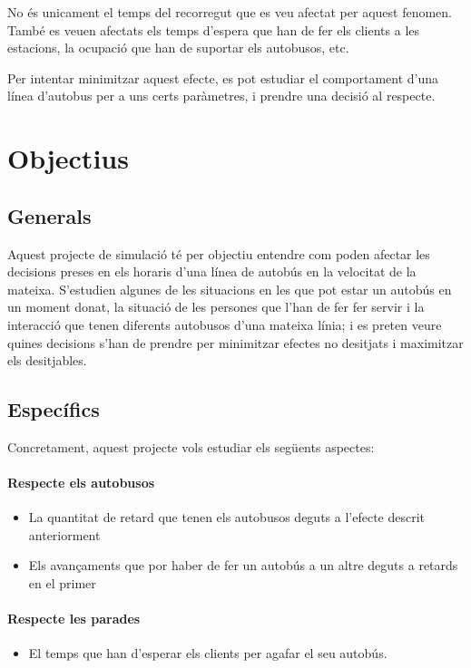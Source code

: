 \documentclass[a4paper,10pt]{article}
\begin{document}
No és unicament el temps del recorregut que es veu afectat per aquest fenomen. També es veuen afectats els temps d'espera que han de fer els clients a les estacions, la ocupació que han de suportar els autobusos, etc.

Per intentar minimitzar aquest efecte, es pot estudiar el comportament d'una línea d'autobus per a uns certs paràmetres, i prendre una decisió al respecte.


\section{Objectius}
\subsection{Generals}

Aquest projecte de simulació té per objectiu entendre com poden afectar les decisions preses en els horaris d'una línea de autobús en la velocitat de la mateixa. S'estudien algunes de les situacions en les que pot estar un autobús en un moment donat, la situació de les persones que l'han de fer fer servir i la interacció que tenen diferents autobusos d'una mateixa línia; i es preten veure quines decisions s'han de prendre per minimitzar efectes no desitjats i maximitzar els desitjables.

\subsection{Específics}

Concretament, aquest projecte vols estudiar els següents aspectes:
\paragraph{Respecte els autobusos}
\begin{itemize}
 \item La quantitat de retard que tenen els autobusos deguts a l'efecte descrit anteriorment
 \item Els avançaments que por haber de fer un autobús a un altre deguts a retards en el primer
\end{itemize}

\paragraph{Respecte les parades}
\begin{itemize}
 \item El temps que han d'esperar els clients per agafar el seu autobús.
\end{itemize}
\end{document}
